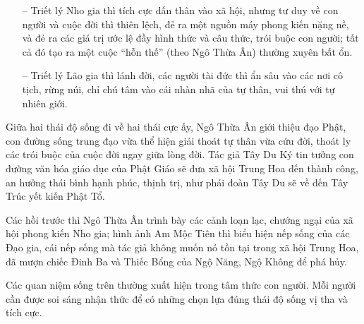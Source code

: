 \begin{itemize}
    \item[–] Triết lý Nho gia thì tích cực dấn thân vào xã hội, nhưng tư duy về con người và cuộc đời thì thiên lệch, đẻ ra một nguồn máy phong kiến nặng nề, và đẻ ra các giá trị ước lệ đầy hình thức và câu thức, trói buộc con người; tất cả đó tạo ra một cuộc ``hỗn thế'' (theo Ngô Thừa Ân) thường xuyên bất ổn.

    \item[–] Triết lý Lão gia thì lánh đời, các người tài đức thì ẩn sâu vào các nơi cô tịch, rừng núi, chỉ chú tâm vào cái nhàn nhã của tự thân, vui thú với tự nhiên giới.
\end{itemize}

Giữa hai thái độ sống đi về hai thái cực ấy, Ngô Thừa Ân giới thiệu đạo Phật, con đường sống trung đạo vừa thể hiện giải thoát tự thân vừa cứu đời, thoát ly các trói buộc của cuộc đời ngay giữa lòng đời. Tác giả Tây Du Ký tin tưởng con đường văn hóa giáo dục của Phật Giáo sẽ đưa xã hội Trung Hoa đến thành công, an hưởng thái bình hạnh phúc, thịnh trị, như phái đoàn Tây Du sẽ về đến Tây Trúc yết kiến Phật Tổ.

Các hồi trước thì Ngô Thừa Ân trình bày các cảnh loạn lạc, chướng ngại của xã hội phong kiến Nho gia; hình ảnh Am Mộc Tiên thì biểu hiện nếp sống của các Đạo gia, cái nếp sống mà tác giả không muốn nó tồn tại trong xã hội Trung Hoa, đã mượn chiếc Đinh Ba và Thiếc Bổng của Ngộ Năng, Ngộ Không để phá hủy.

Các quan niệm sống trên thường xuất hiện trong tâm thức con người. Mỗi người cần được soi sáng nhận thức để có những chọn lựa đúng thái độ sống vị tha và tích cực.
